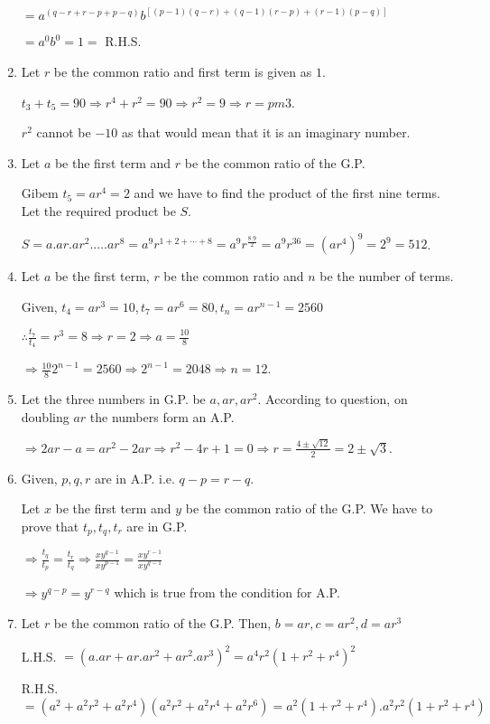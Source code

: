 \begin{enumerate}
  $= a^{(q - r + r - p + p - q)}b^{[(p - 1)(q - r) + (q - 1)(r - p) + (r - 1)(p - q)]}$

  $= a^0b^0 = 1 =$ R.H.S.
\item Let $r$ be the common ratio and first term is given as $1$.

  $t_3 + t_5 = 90 \Rightarrow r^4 + r^2 = 90 \Rightarrow r^2 = 9 \Rightarrow r = pm 3$.

  $r^2$ cannot be $-10$ as that would mean that it is an imaginary number.
\item Let $a$ be the first term and $r$ be the common ratio of the G.P.

  Gibem $t_5 = ar^4 = 2$ and we have to find the product of the first nine terms. Let the required product be $S$.

  $S = a.ar.ar^2.\ldots.ar^8 = a^9r^{1 + 2 + \cdots + 8} = a^9r^{\tfrac{8.9}{2}} = a^9r^{36} = (ar^4)^9 = 2^9 = 512$.
\item Let $a$ be the first term, $r$ be the common ratio and $n$ be the number of terms.

  Given, $t_4 = ar^3 = 10, t_7 = ar^6 = 80, t_n = ar^{n - 1} = 2560$

  $\therefore \frac{t_7}{t_4} = r^3 = 8 \Rightarrow r = 2 \Rightarrow a = \frac{10}{8}$

  $\Rightarrow \frac{10}{8}2^{n- 1} = 2560 \Rightarrow 2^{n - 1} = 2048 \Rightarrow n = 12$.
\item Let the three numbers in G.P. be $a, ar, ar^2$. According to question, on doubling $ar$ the numbers form an A.P.

  $\Rightarrow 2ar - a = ar^2 - 2ar \Rightarrow r^2 - 4r + 1 = 0 \Rightarrow r = \frac{4\pm\sqrt{12}}{2} = 2\pm\sqrt{3}$.
\item Given, $p, q, r$ are in A.P. i.e. $q - p = r - q$.

  Let $x$ be the first term and $y$ be the common ratio of the G.P. We have to prove that $t_p, t_q, t_r$ are in G.P.

  $\Rightarrow \frac{t_q}{t_p} = \frac{t_r}{t_q} \Rightarrow \frac{xy^{q - 1}}{xy ^{p - 1}} = \frac{xy^{r - 1}}{xy^{q - 1}}$

  $\Rightarrow y^{q - p} = y^{r - q}$ which is true from the condition for A.P.
\item Let $r$ be the common ratio of the G.P. Then, $b = ar, c = ar^2, d = ar^3$

  L.H.S. $= (a.ar + ar.ar^2 + ar^2.ar^3)^2 = a^4r^2(1 + r^2 + r^4)^2$

  R.H.S. $= (a^2 + a^2r^2 + a^2r^4)(a^2r^2 + a^2r^4 + a^2r^6) = a^2(1 + r^2 + r^4).a^2r^2(1 + r^2 + r^4)$


\end{enumerate}
